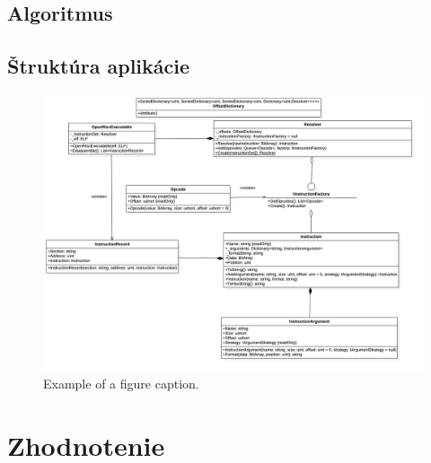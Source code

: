 \documentclass[conference]{IEEEtran}
\begin{document}
\subsection{Algoritmus}

\subsection{Štruktúra aplikácie}

\begin{figure}[htbp]
\centerline{\includegraphics[width=\columnwidth]{diagrams/ClassDiagram}}
\caption{Example of a figure caption.}
\label{fig}
\end{figure}

\section{Zhodnotenie}




\end{document}
